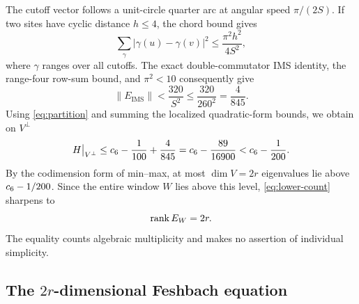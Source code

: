 The cutoff vector follows a unit-circle quarter arc at angular speed
\(\pi/(2S)\).  If two sites have cyclic distance \(h\leq4\), the chord bound
gives
\[
 \sum_\gamma|\gamma(u)-\gamma(v)|^2
 \leq\frac{\pi^2h^2}{4S^2},
\]
where \(\gamma\) ranges over all cutoffs.  The exact double-commutator IMS
identity, the range-four row-sum bound, and \(\pi^2<10\) consequently give
\begin{equation}
 \|E_{\mathrm{IMS}}\|<\frac{320}{S^2}
 \leq\frac{320}{260^2}=\frac4{845}.
 \label{eq:ims}
\end{equation}
Using \eqref{eq:partition} and summing the localized quadratic-form bounds,
we obtain on \(V^\perp\)
\begin{equation}
 H\big|_{V^\perp}
 \leq c_6-\frac1{100}+\frac4{845}
 =c_6-\frac{89}{16900}
 <c_6-\frac1{200}.
 \label{eq:complement-finite}
\end{equation}
By the codimension form of min--max, at most \(\dim V=2r\) eigenvalues lie
above \(c_6-1/200\).  Since the entire window \(W\) lies above this
level, \eqref{eq:lower-count} sharpens to
\begin{equation}
 \operatorname{rank} E_W=2r.
 \label{eq:exact-count}
\end{equation}
The equality counts algebraic multiplicity and makes no assertion of
individual simplicity.

\subsection{The \texorpdfstring{\(2r\)}{2r}-dimensional Feshbach equation}

